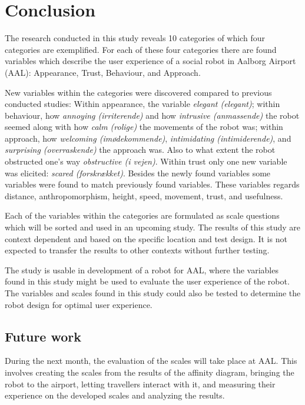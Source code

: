 \section{Conclusion}
\label{Conclusion}
%
The research conducted in this study reveals 10 categories of which four categories are exemplified. For each of these four categories there are found variables which describe the user experience of a social robot in Aalborg Airport (AAL): Appearance, Trust, Behaviour, and Approach.

New variables within the categories were discovered compared to previous conducted studies: Within appearance, the variable \textit{elegant (elegant)}; within behaviour, how \textit{annoying (irriterende)} and how \textit{intrusive (anmassende)} the robot seemed along with how \textit{calm (rolige)} the movements of the robot was; within approach, how \textit{welcoming (imødekommende)}, \textit{intimidating (intimiderende)}, and \textit{surprising (overraskende)} the approach was. Also to what extent the robot obstructed one's way \textit{obstructive (i vejen)}. Within trust only one new variable was elicited: \textit{scared (forskrækket)}. Besides the newly found variables some variables were found to match previously found variables. These variables regards distance, anthropomorphism, height, speed, movement, trust, and usefulness.

Each of the variables within the categories are formulated as scale questions which will be sorted and used in an upcoming study. The results of this study are context dependent and based on the specific location and test design. It is not expected to transfer the results to other contexts without further testing. 

The study is usable in development of a robot for AAL, where the variables found in this study might be used to evaluate the user experience of the robot. The variables and scales found in this study could also be tested to determine the robot design for optimal user experience.

\subsection{Future work}
During the next month, the evaluation of the scales will take place at AAL. This involves creating the scales from the results of the affinity diagram, bringing the robot to the airport, letting travellers interact with it, and measuring their experience on the developed scales and analyzing the results.

